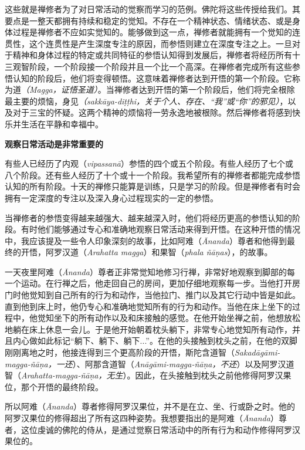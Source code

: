 这些就是禅修者为了对日常活动的觉察而学习的范例。佛陀将这些传授\1给我们。其要点是一整天都拥有持续和稳定的觉知。不存在一个精神状态、情绪状态、或是身体过程是禅修者不应如实觉知的。能够做到这一点，禅修者就能拥有一个觉知的连贯性，这个连贯性是产生深度专注的原因，而参悟则建立在深度专注之上。一旦对于精神和身体过程的特定或共同特征的参悟认知得到发展后，禅修者将经历所有十三观智阶段，一个阶段接一个阶段并且一个比一个高深。在禅修者完成所有这些参悟认知的阶段后，他们将变得顿悟。这意味着禅修者达到开悟的第一个阶段。它称为道{\it （Magga，证悟圣道）}。当禅修者达到开悟的第一个阶段后，他们将完全根除最主要的烦恼，身见{\it （sakk\=aya-di\d t\d thi，关于个人、存在、“我”或“你”的邪见）}，以及对于三宝的怀疑。这两个精神的烦恼将一劳永逸地被根除。然后禅修者将感到快乐并生活在平静和幸福中。

{\medbreak\bf 观察日常活动是非常重要的\smallbreak}

有些人已经历了内观（{\it vipassan\=a}）参悟的四个或五个阶段。有些人经历了七个或八个阶段。还有些人经历了十个或十一个阶段。我希望所有的禅修者都能完成参悟认知的所有阶段。十天的禅修只能算是训练，只是学习的阶段。但是禅修者有时会拥有一定深度的专注以及深入身心过程现实的一定的参悟。

当禅修者的参悟变得越来越\1强大、越来越深入时，他们将经历更高的参悟认知的阶段。有时他们能够通过专心和准确地观察日常活动来得到开悟。在这种开悟的情况中，我应该提及一些令人印象深刻的故事，比如阿难（{\it \=Ananda}）尊者和他得到最终的开悟，阿罗汉道（{\it Arahatta magga}）和果智（{\it phala \~n\=a\d nas}），的故事。

一天夜里阿难（{\it \=Ananda}）尊者正非常觉知地修习行禅，非常好地观察到脚部的每一个运动。在行禅之后，他走回自己的房间，更加仔细地观察每一步。当他打开房门时他觉知到自己所有的行为和动作，当他拉门、推门以及其它行动中皆是如此。直到他到床上时，他仍专心和准确地觉知所有的行为和动作。当他在床上坐下的过程中，他觉知坐下的所有动作以及和床接触的感觉。在他开始坐禅之前，他想放松地躺在床上休息一会儿。于是他开始朝着枕头躺下，非常专心地觉知所有动作，并且内心做如此标记“躺下、躺下、躺下...”。在他的头接触到枕头之前，在他的双脚刚刚离地之时，他接连得到三个更高阶段的开悟，斯陀含道智（{\it Sakad\=ag\=ami-magga-\~n\=a\d na，一还}）、阿那含道智（{\it An\=ag\=ami-magga-\~n\=a\d na，不还}）以及阿罗汉道智（{\it Arahatta-magga-\~n\=a\d na，无生}）。因此，在头接触到枕头之前他修得阿罗汉果位，那个开悟的最终阶段。

所以阿难（{\it \=Ananda}）尊者修得阿罗汉果位，并不是在立、坐、行或卧之时。他的阿罗汉果位的修得超出了所有这四种姿势。\1我想要指出的是阿难（{\it \=Ananda}）尊者，这位虔诚的佛陀的侍从，是通过觉察日常活动中的所有行为和动作修得阿罗汉果位的。

